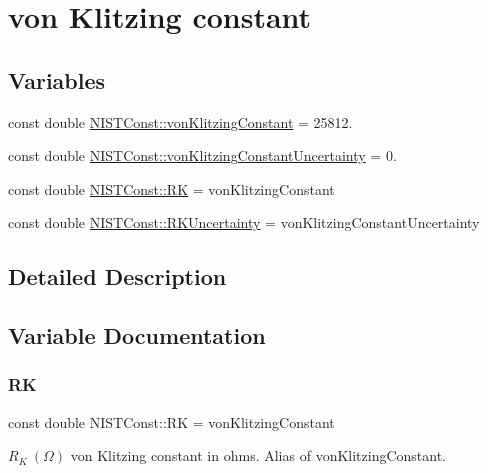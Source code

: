 \hypertarget{group__von_klitzing_constant}{}\section{von Klitzing constant}
\label{group__von_klitzing_constant}
\subsection*{Variables}
\begin{DoxyCompactItemize}
\item 
const double \hyperlink{group__von_klitzing_constant_ga664441cab64a6a8feda702f6354c1e7f}{N\+I\+S\+T\+Const\+::von\+Klitzing\+Constant} = 25812.
\item 
const double \hyperlink{group__von_klitzing_constant_ga8fa7b05f4ab4958f9bed81f592304e49}{N\+I\+S\+T\+Const\+::von\+Klitzing\+Constant\+Uncertainty} = 0.
\item 
const double \hyperlink{group__von_klitzing_constant_ga49d5fad3e8e7b5800765ce47a748ebae}{N\+I\+S\+T\+Const\+::\+RK} = von\+Klitzing\+Constant
\item 
const double \hyperlink{group__von_klitzing_constant_ga2be2be38b579e6afb6f1b0d177d7786b}{N\+I\+S\+T\+Const\+::\+R\+K\+Uncertainty} = von\+Klitzing\+Constant\+Uncertainty
\end{DoxyCompactItemize}


\subsection{Detailed Description}


\subsection{Variable Documentation}
\mbox{\label{group__von_klitzing_constant_ga49d5fad3e8e7b5800765ce47a748ebae}} 
\subsubsection{\texorpdfstring{RK}{RK}}
{\footnotesize\ttfamily const double N\+I\+S\+T\+Const\+::\+RK = von\+Klitzing\+Constant}

$R_K \ (\Omega)$ von Klitzing constant in ohms. Alias of von\+Klitzing\+Constant. \mbox{\label{group__von_klitzing_constant_ga2be2be38b579e6afb6f1b0d177d7786b}} 
